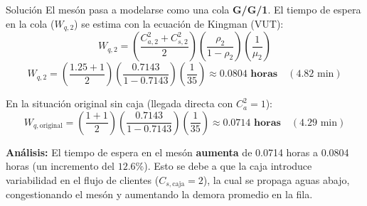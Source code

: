 \documentclass[11pt, a4paper]{article}
\begin{document}
\begin{ejercicio}{Solución}
  El mesón pasa a modelarse como una cola \textbf{G/G/1}. El tiempo de espera en la cola ($W_{q,2}$) se estima con la ecuación de Kingman (VUT):
  \begin{equation*}
    W_{q,2} = \left( \frac{C_{a,2}^2 + C_{s,2}^2}{2} \right) \left( \frac{\rho_2}{1 - \rho_2} \right) \left( \frac{1}{\mu_2} \right)
  \end{equation*}
  \begin{equation*}
    W_{q,2} = \left( \frac{1.25 + 1}{2} \right) \left( \frac{0.7143}{1 - 0.7143} \right) \left( \frac{1}{35} \right) \approx \mathbf{0.0804 \text{ horas}} \quad (4.82 \text{ min})
  \end{equation*}

  En la situación original sin caja (llegada directa con $C_{a}^2 = 1$):
  \begin{equation*}
    W_{q,\text{original}} = \left( \frac{1 + 1}{2} \right) \left( \frac{0.7143}{1 - 0.7143} \right) \left( \frac{1}{35} \right) \approx \mathbf{0.0714 \text{ horas}} \quad (4.29 \text{ min})
  \end{equation*}

  \textbf{Análisis:} El tiempo de espera en el mesón \textbf{aumenta} de 0.0714 horas a 0.0804 horas (un incremento del $12.6\%$). Esto se debe a que la caja introduce variabilidad en el flujo de clientes ($C_{s,\text{caja}} = 2$), la cual se propaga aguas abajo, congestionando el mesón y aumentando la demora promedio en la fila.

\end{ejercicio}
\end{document}
